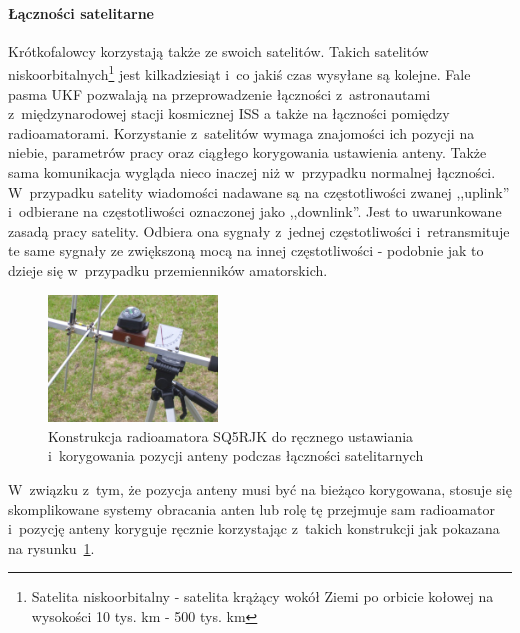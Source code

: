 \documentclass[]{mgr}
\begin{document}
                    \paragraph{Łączności satelitarne}
                    Krótkofalowcy korzystają także ze swoich satelitów. Takich satelitów niskoorbitalnych\footnote{Satelita niskoorbitalny - satelita krążący wokół Ziemi po orbicie kołowej na wysokości 10 tys. km - 500 tys. km} jest kilkadziesiąt i~co jakiś czas wysyłane są kolejne. Fale pasma UKF pozwalają na przeprowadzenie łączności z~astronautami z~międzynarodowej stacji kosmicznej ISS a także na łączności pomiędzy radioamatorami. Korzystanie z~satelitów wymaga znajomości ich pozycji na niebie, parametrów pracy oraz ciągłego korygowania ustawienia anteny. Także sama komunikacja wygląda nieco inaczej niż w~przypadku normalnej łączności. W~przypadku satelity wiadomości nadawane są na częstotliwości zwanej ,,uplink'' i~odbierane na częstotliwości oznaczonej jako ,,downlink''. Jest to uwarunkowane zasadą pracy satelity. Odbiera ona sygnały z~jednej częstotliwości i~retransmituje te same sygnały ze zwiększoną mocą na innej częstotliwości - podobnie jak to dzieje się w~przypadku przemienników amatorskich.
                        \begin{figure}
                            \vspace{-25pt}
                            \begin{center}
                                \includegraphics[width=0.4\textwidth]{example_sat_construction}
                            \end{center}
                            \vspace{-20pt}
                            \caption{Konstrukcja radioamatora SQ5RJK do ręcznego ustawiania i~korygowania pozycji anteny podczas łączności satelitarnych}
                            \vspace{-50pt}
                            \label{fig:example_sat_construction}
                        \end{figure}
                    W~związku z~tym, że pozycja anteny musi być na bieżąco korygowana, stosuje się skomplikowane systemy obracania anten lub rolę tę przejmuje sam radioamator i~pozycję anteny koryguje ręcznie korzystając z~takich konstrukcji jak pokazana na rysunku~\ref{fig:example_sat_construction}.
\end{document}
